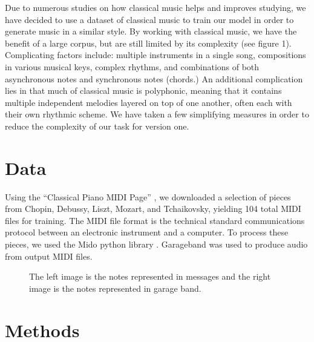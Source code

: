 \documentclass{article}
\begin{document}
\par Due to numerous studies on how classical music helps and improves studying, we have decided to use a dataset of classical music to train our model in order to generate music in a similar style. By working with classical music, we have the benefit of a large corpus, but are still limited by its complexity (see figure 1). Complicating factors include: multiple instruments in a single song, compositions in various musical keys, complex rhythms, and combinations of both asynchronous notes and synchronous notes (chords.) An additional complication lies in that much of classical music is polyphonic, meaning that it contains multiple independent melodies layered on top of one another, often each with their own rhythmic scheme. We have taken a few simplifying measures in order to reduce the complexity of our task for version one. 


\section{Data}
Using the “Classical Piano MIDI Page” \cite{Mozart}, we downloaded a selection of pieces from Chopin, Debussy, Liszt, Mozart, and Tchaikovsky, yielding 104 total MIDI files for training. The MIDI file format is the technical standard communications protocol between an electronic instrument and a computer. To process these pieces, we used the Mido python library \cite{midodoc}. Garageband \cite{garageband} was used to produce audio from output MIDI files. 

\begin{figure}[ht]
\centering
{}
\caption{The left image is the notes represented in messages and the right image is the notes represented in garage band.}
\end{figure}

\section{Methods}
\end{document}
